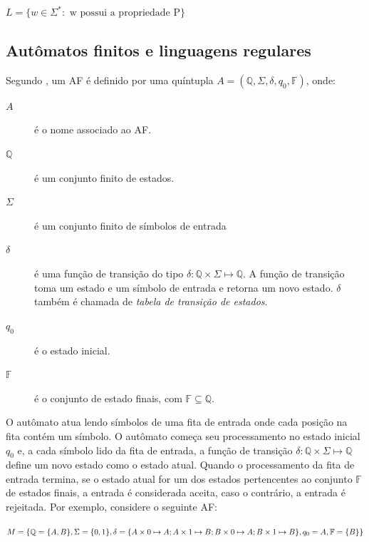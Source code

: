 \documentclass[12pt,a4paper]{article}
\begin{document}
\begin{center}
$L = \{w \in \Sigma^*: \mbox{ w possui a propriedade P}\}$
\end{center}

\subsection{Autômatos finitos e linguagens regulares}

Segundo , um AF é definido por
uma quíntupla $A = (\mathbb{Q},\Sigma,\delta,q_0,\mathbb{F})$, onde:

\begin{description}
\item[$A$] é o nome associado ao AF.
\item[$\mathbb{Q}$] é um conjunto finito de estados.
\item[$\Sigma$] é um conjunto finito de símbolos de entrada
\item[$\delta$] é uma função de transição do tipo $\delta: \mathbb{Q} \times \Sigma \mapsto \mathbb{Q}$.
A função de transição toma um estado e um símbolo de entrada e retorna um novo estado.
$\delta$ também é chamada de \textit{tabela de transição de estados}.
\item[$q_0$] é o estado inicial.
\item[$\mathbb{F}$] é o conjunto de estado finais, com $\mathbb{F} \subseteq \mathbb{Q}$.
\end{description}

O autômato atua lendo símbolos de uma fita de entrada onde cada posição na fita
contém um símbolo. O autômato começa seu processamento no estado inicial $q_0$ e,
a cada símbolo lido da fita de entrada, a função de transição
$\delta: \mathbb{Q} \times \Sigma \mapsto \mathbb{Q}$ define um novo estado como o estado atual.
Quando o processamento da fita de entrada termina, se o estado atual for
um dos estados pertencentes ao conjunto $\mathbb{F}$ de estados finais, a entrada é
considerada aceita, caso o contrário, a entrada é rejeitada. Por exemplo,
considere o seguinte AF:

\begin{center}
$M = \{ \mathbb{Q} = \{A,B\}, \break \Sigma = \{0,1\}, \break
\delta = \{A \times 0 \mapsto A; A \times 1 \mapsto B; B \times 0 \mapsto A; B \times 1 \mapsto B\}, \break
q_0 = A, \break \mathbb{F} = \{B\} \}$
\end{center}
\end{document}
